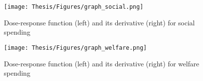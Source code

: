 \documentclass[12pt]{article}
\begin{document}
\begin{figure}[h!]
    \centering
    \texttt{[image: Thesis/Figures/graph\_social.png]}
    \caption{Dose-response function (left) and its derivative (right) for social spending}
    \label{fig:graph_educ}
\end{figure}

\begin{figure}[h!]
    \centering
    \texttt{[image: Thesis/Figures/graph\_welfare.png]}
    \caption{Dose-response function (left) and its derivative (right) for welfare spending}
    \label{fig:graph_educ}
\end{figure}
\end{document}
